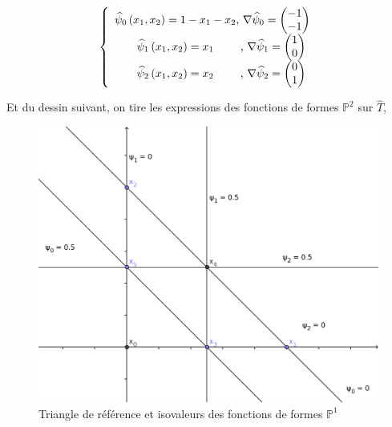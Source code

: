 \documentclass[a4paper,12pt]{article}
\begin{document}
\begin{equation}
\left \{
\begin{array}{c @{} c}
\widehat{\psi}_{0} \left( x_{1},x_{2} \right)  = 1-x_1-x_2 & \text{, } \nabla \widehat{\psi}_0 = \left( \begin{matrix}
-1 \\
-1 \\
\end{matrix} \right) \\
\widehat{\psi}_{1} \left( x_{1},x_{2} \right)  = x_1 & \text{, } \nabla \widehat{\psi}_1 = \left( \begin{matrix}
1 \\
0 \\
\end{matrix} \right) \\
\widehat{\psi}_{2} \left( x_{1},x_{2} \right)  = x_2 & \text{, } \nabla \widehat{\psi}_2 = \left( \begin{matrix}
0 \\
1 \\
\end{matrix} \right) \\
\end{array}
\right.
\end{equation}

Et du dessin suivant, on tire les expressions des fonctions de formes $\mathbb{P}^{2}$ sur $\widehat{T}$,

\begin{figure}[!t]                                                                                                                                                                                                                                                                                                                                                                                
		\centering
        \includegraphics[width = 0.5\linewidth]{image/triang_ref}                                                                                                                                                                                                                                                                                                                                               
\caption{Triangle de référence et isovaleurs des fonctions de formes $\mathbb{P}^{1}$}                                                                                                                                        
\end{figure}
\end{document}
